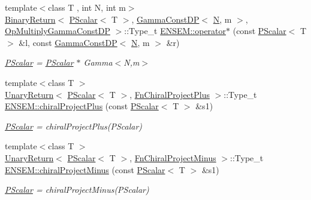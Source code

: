 \begin{DoxyCompactItemize}
{\footnotesize template$<$class T , int N, int m$>$ }\\\mbox{\hyperlink{structENSEM_1_1BinaryReturn}{Binary\+Return}}$<$ \mbox{\hyperlink{classENSEM_1_1PScalar}{P\+Scalar}}$<$ T $>$, \mbox{\hyperlink{classENSEM_1_1GammaConstDP}{Gamma\+Const\+DP}}$<$ \mbox{\hyperlink{operator__name__util_8cc_a7722c8ecbb62d99aee7ce68b1752f337}{N}}, m $>$, \mbox{\hyperlink{structENSEM_1_1OpMultiplyGammaConstDP}{Op\+Multiply\+Gamma\+Const\+DP}} $>$\+::Type\+\_\+t \mbox{\hyperlink{group__primscalar_ga97e70139990daa175326a04636431dbd}{E\+N\+S\+E\+M\+::operator$\ast$}} (const \mbox{\hyperlink{classENSEM_1_1PScalar}{P\+Scalar}}$<$ T $>$ \&l, const \mbox{\hyperlink{classENSEM_1_1GammaConstDP}{Gamma\+Const\+DP}}$<$ \mbox{\hyperlink{operator__name__util_8cc_a7722c8ecbb62d99aee7ce68b1752f337}{N}}, m $>$ \&r)
\begin{DoxyCompactList}\small\item\em \mbox{\hyperlink{classENSEM_1_1PScalar}{P\+Scalar}} = \mbox{\hyperlink{classENSEM_1_1PScalar}{P\+Scalar}} $\ast$ Gamma$<$\+N,m$>$ \end{DoxyCompactList}\item 
{\footnotesize template$<$class T $>$ }\\\mbox{\hyperlink{structENSEM_1_1UnaryReturn}{Unary\+Return}}$<$ \mbox{\hyperlink{classENSEM_1_1PScalar}{P\+Scalar}}$<$ T $>$, \mbox{\hyperlink{structENSEM_1_1FnChiralProjectPlus}{Fn\+Chiral\+Project\+Plus}} $>$\+::Type\+\_\+t \mbox{\hyperlink{group__primscalar_ga5c2866755d31c5ec528c5763aa16a833}{E\+N\+S\+E\+M\+::chiral\+Project\+Plus}} (const \mbox{\hyperlink{classENSEM_1_1PScalar}{P\+Scalar}}$<$ T $>$ \&s1)
\begin{DoxyCompactList}\small\item\em \mbox{\hyperlink{classENSEM_1_1PScalar}{P\+Scalar}} = chiral\+Project\+Plus(\+P\+Scalar) \end{DoxyCompactList}\item 
{\footnotesize template$<$class T $>$ }\\\mbox{\hyperlink{structENSEM_1_1UnaryReturn}{Unary\+Return}}$<$ \mbox{\hyperlink{classENSEM_1_1PScalar}{P\+Scalar}}$<$ T $>$, \mbox{\hyperlink{structENSEM_1_1FnChiralProjectMinus}{Fn\+Chiral\+Project\+Minus}} $>$\+::Type\+\_\+t \mbox{\hyperlink{group__primscalar_ga145e49e169b22a3ded82ba8af1b15da2}{E\+N\+S\+E\+M\+::chiral\+Project\+Minus}} (const \mbox{\hyperlink{classENSEM_1_1PScalar}{P\+Scalar}}$<$ T $>$ \&s1)
\begin{DoxyCompactList}\small\item\em \mbox{\hyperlink{classENSEM_1_1PScalar}{P\+Scalar}} = chiral\+Project\+Minus(\+P\+Scalar) \end{DoxyCompactList}\item 

\end{DoxyCompactItemize}

